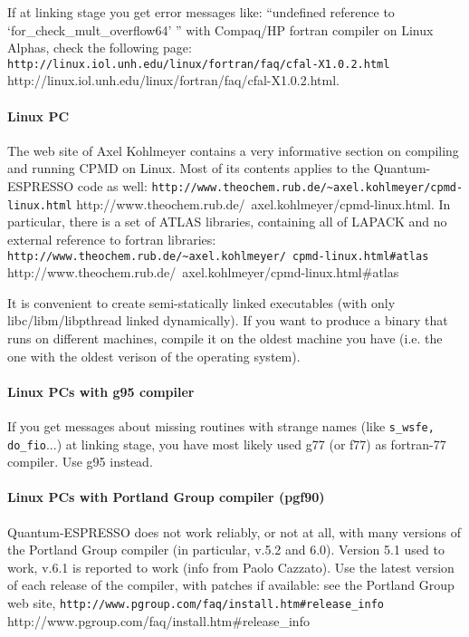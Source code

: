 \documentclass[12pt,a4paper]{article}
\begin{document}
If at linking stage you get error messages like: ``undefined reference
to `for\_check\_mult\_overflow64' '' with Compaq/HP fortran compiler
on Linux Alphas, check the following page:
\htmladdnormallink%
{\texttt{http://linux.iol.unh.edu/linux/fortran/faq/cfal-X1.0.2.html}}%
{http://linux.iol.unh.edu/linux/fortran/faq/cfal-X1.0.2.html}.

\paragraph{Linux PC}

The web site of Axel Kohlmeyer contains a very informative section 
on compiling and running CPMD on Linux.
Most of its contents applies to the Quantum-ESPRESSO code as well:\hfill\break
\htmladdnormallink%
{\texttt{http://www.theochem.rub.de/\~{}axel.kohlmeyer/cpmd-linux.html}}%
{http://www.theochem.rub.de/~axel.kohlmeyer/cpmd-linux.html}.
In particular, there is a set of ATLAS libraries, containing 
all of LAPACK and no external reference to fortran libraries:\hfill\break
\htmladdnormallink%
{{\small\texttt{http://www.theochem.rub.de/\~{}axel.kohlmeyer/%
                cpmd-linux.html\#atlas}}}%
{http://www.theochem.rub.de/~axel.kohlmeyer/cpmd-linux.html\#atlas}

It is convenient to create semi-statically linked executables
(with only libc/libm/libpthread linked dynamically). If you want
to produce a binary that runs on different machines, compile it
on the oldest machine you have (i.e. the one with the oldest verison
of the operating system).

\paragraph{Linux PCs with g95 compiler}

If you get messages about missing routines with strange names 
(like \texttt{s\_wsfe, do\_fio}...) at linking stage, you
have most likely used g77 (or f77) as fortran-77 compiler.
Use g95 instead.

\paragraph{Linux PCs with Portland Group compiler (pgf90)}
\hfill\break
Quantum-ESPRESSO does not work reliably, or not at all, with many
versions of the Portland Group compiler (in particular, v.5.2
and 6.0). Version 5.1 used to work, v.6.1 is reported to work
(info from Paolo Cazzato). Use the latest version of each release 
of the compiler, with patches if available: see the Portland Group 
web site,\hfill\break
\htmladdnormallink%
{\texttt{http://www.pgroup.com/faq/install.htm\#release\_info}}%
{http://www.pgroup.com/faq/install.htm\#release\_info}
\end{document}
